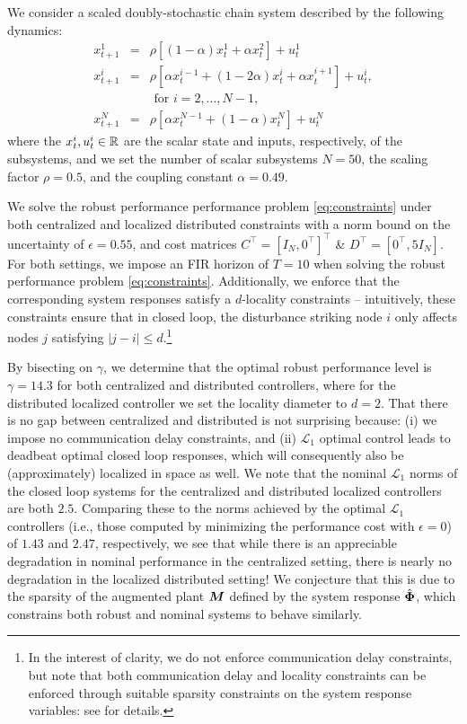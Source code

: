 We consider a scaled doubly-stochastic chain system described by the following dynamics:
\begin{equation}\label{eq:chain}
\begin{array}{rcl}
x^1_{t+1} &=& \rho\left[(1-\alpha)x^1_t + \alpha x^2_t\right] + u^1_t\\
x^i_{t+1} &=& \rho\left[\alpha x^{i-1}_t + (1-2\alpha)x^i_t + \alpha x^{i+1}_t\right] + u^i_t,\\
&& \text{ for $i=2,\dots,N-1$,} \\
 x^N_{t+1} &=& \rho\left[\alpha x^{N-1}_t + (1-\alpha)x^N_t\right] + u^N_t
 \end{array}
\end{equation}
where the $x^i_t, u^i_t \in \mathbb{R}$ are the scalar state and inputs, respectively, of the subsystems, and we set the number of scalar subsystems $N=50$, the scaling factor $\rho = 0.5$, and the coupling constant $\alpha = 0.49$.  

We solve the robust performance performance problem \eqref{eq:constraints} under both centralized and localized distributed constraints with a norm bound on the uncertainty of $\epsilon = 0.55$, and cost matrices $C^\top = [I_N, 0^\top]^\top$ \& $D^\top = [0^\top, 5I_N]$.  For both settings, we impose an FIR horizon of $T=10$ when solving the robust performance problem \eqref{eq:constraints}.  Additionally, we enforce that the corresponding system responses satisfy a $d$-locality constraints -- intuitively, these constraints ensure that in closed loop, the disturbance striking node $i$ only affects nodes $j$ satisfying $|j-i|\leq d$.\footnote{In the interest of clarity, we do not enforce communication delay constraints, but note that both communication delay and locality constraints can be enforced through suitable sparsity constraints on the system response variables: see \cite{anderson2019system} for details.}

By bisecting on $\gamma$, we determine that the optimal robust performance level is $\gamma = 14.3$ for both centralized and distributed controllers, where for the distributed localized controller we set the locality diameter to $d=2$.  That there is no gap between centralized and distributed is not surprising because: (i) we impose no communication delay constraints, and (ii) $\mathcal{L}_1$ optimal control leads to deadbeat optimal closed loop responses, which will consequently also be (approximately) localized in space as well.  We note that the nominal $\mathcal{L}_1$ norms of the closed loop systems for the centralized and distributed localized controllers are both $2.5$.  Comparing these to the norms achieved by the optimal $\mathcal{L}_1$ controllers (i.e., those computed by minimizing the performance cost with $\epsilon = 0$) of $1.43$ and $2.47$, respectively, we see that while there is an appreciable degradation in nominal performance in the centralized setting, there is nearly no degradation in the localized distributed setting!  We conjecture that this is due to the sparsity of the augmented plant $\boldsymbol{M}$ defined by the system response $\hat{\boldsymbol{\Phi}}$, which constrains both robust and nominal systems to behave similarly.

